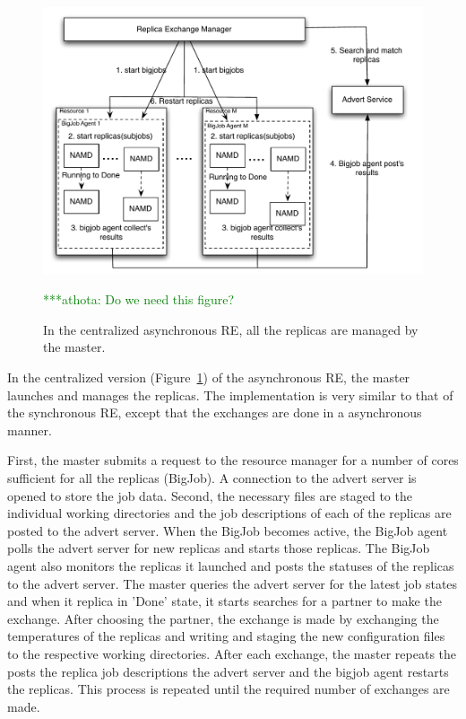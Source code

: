 \documentclass{rspublic}
\newcommand{\athotanote}[1]{ {\textcolor{green} { ***athota: #1 }}}
\newcommand{\athotanote}[1]{}
\begin{document}
\begin{figure}
\centering
\includegraphics[width=1\textwidth]{centralized.pdf}
\caption{\small  In the centralized asynchronous RE, all the replicas are managed by the master.} \athotanote{Do we need this figure?} 
\label{fig:cent}
\end{figure}

In the centralized version (Figure~\ref{fig:cent}) of the asynchronous RE, the master launches and manages the replicas. The implementation is very similar to that of the synchronous RE, except that the exchanges are done in a asynchronous manner. 

First, the master submits a request to the resource manager for a  
number of cores sufficient for all the replicas (BigJob). A connection to the 
advert server is opened to store the job data. Second, 
the necessary files are staged to the individual working directories and 
the job descriptions of each of the replicas are 
posted to the advert server. When the BigJob becomes active, 
the BigJob agent polls the advert server for new replicas 
and starts those replicas. The BigJob agent also monitors the 
replicas it launched and posts the statuses of the replicas to the advert 
server. The master queries the advert server for the latest job 
states and when it replica in 'Done' state, it 
starts searches for a partner to make the exchange. After choosing the partner, the exchange is made by exchanging the temperatures of the replicas and writing and staging the new configuration files 
to the respective working directories. After each exchange, the master repeats the posts the replica job descriptions 
the advert server and the bigjob agent restarts the 
replicas. This process is repeated until the required number of 
exchanges are made.
\end{document}
